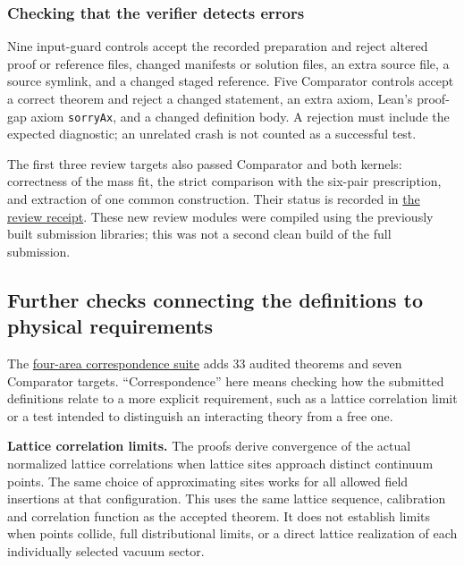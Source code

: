 \documentclass[
  11pt,
]{article}
\begin{document}
\subsubsection{Checking that the verifier detects
errors}\label{checking-that-the-verifier-detects-errors}

Nine input-guard controls accept the recorded preparation and reject
altered proof or reference files, changed manifests or solution files,
an extra source file, a source symlink, and a changed staged reference.
Five Comparator controls accept a correct theorem and reject a changed
statement, an extra axiom, Lean's proof-gap axiom
{\small \nolinkurl{sorryAx}}, and a changed definition body. A rejection
must include the expected diagnostic; an unrelated crash is not counted
as a successful test.

The first three review targets also passed Comparator and both kernels:
correctness of the mass fit, the strict comparison with the six-pair
prescription, and extraction of one common construction. Their status is
recorded in
\href{https://github.com/yang-mills-group/QCD/blob/main/evidence/independent-checks/review-comparator/result.json}{the
review receipt}. These new review modules were compiled using the
previously built submission libraries; this was not a second clean build
of the full submission.

\subsection{Further checks connecting the definitions to physical
requirements}\label{further-checks-connecting-the-definitions-to-physical-requirements}

The
\href{https://github.com/yang-mills-group/QCD/blob/main/docs/semantic-tests.md}{four-area
correspondence suite} adds 33 audited theorems and seven Comparator
targets. ``Correspondence'' here means checking how the submitted
definitions relate to a more explicit requirement, such as a lattice
correlation limit or a test intended to distinguish an interacting
theory from a free one.

\textbf{Lattice correlation limits.} The proofs derive convergence of
the actual normalized lattice correlations when lattice sites approach
distinct continuum points. The same choice of approximating sites works
for all allowed field insertions at that configuration. This uses the
same lattice sequence, calibration and correlation function as the
accepted theorem. It does not establish limits when points collide, full
distributional limits, or a direct lattice realization of each
individually selected vacuum sector.
\end{document}
